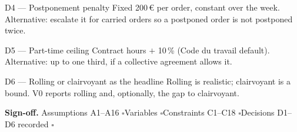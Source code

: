\documentclass[11pt,a4paper]{article}
\newcommand{\ok}{$\square$}
\begin{document}
\begin{decide}{D4 --- Postponement penalty}
Fixed 200\,€ per order, constant over the week. Alternative: escalate it for carried orders so a postponed order is not postponed twice.
\end{decide}

\begin{decide}{D5 --- Part-time ceiling}
Contract hours $+$ 10\,\% (Code du travail default). Alternative: up to one third, if a collective agreement allows it.
\end{decide}

\begin{decide}{D6 --- Rolling or clairvoyant as the headline}
Rolling is realistic; clairvoyant is a bound. V0 reports rolling and, optionally, the gap to clairvoyant.
\end{decide}

\vspace{6pt}
\begin{words}
\textbf{Sign-off.} \quad Assumptions A1--A16 \ok \qquad Variables \ok \qquad Constraints C1--C18 \ok \qquad Decisions D1--D6 recorded \ok
\end{words}
\end{document}
